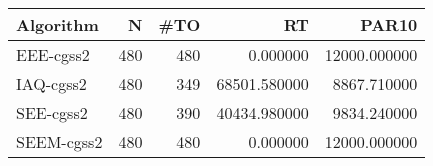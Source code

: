 \begin{tabular}{lrrrr}
\toprule
Algorithm & N & #TO & RT & PAR10 \\
\midrule
EEE-cgss2 & 480 & 480 & 0.000000 & 12000.000000 \\
IAQ-cgss2 & 480 & 349 & 68501.580000 & 8867.710000 \\
SEE-cgss2 & 480 & 390 & 40434.980000 & 9834.240000 \\
SEEM-cgss2 & 480 & 480 & 0.000000 & 12000.000000 \\
\bottomrule
\end{tabular}
